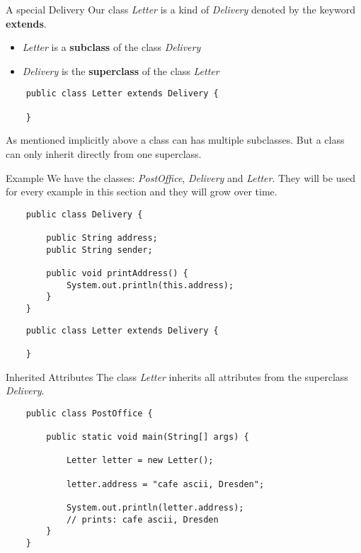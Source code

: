 \begin{frame}[fragile]{A special Delivery}
	Our class \emph{Letter} is a kind of \emph{Delivery} denoted by the keyword \textbf{extends}.
	\begin{itemize}
		\item \emph{Letter} is a \textbf{subclass} of the class \emph{Delivery}
		\item \emph{Delivery} is the \textbf{superclass} of the class \emph{Letter}
	\end{itemize}
	\begin{lstlisting}
	public class Letter extends Delivery {
	
	}
	\end{lstlisting}
	\vfill
	As mentioned implicitly above a class can has multiple subclasses. 
	But a class can only inherit directly from one superclass.
\end{frame}

\begin{frame}[fragile]{Example}
	We have the classes: \emph{PostOffice}, \emph{Delivery} and \emph{Letter}.
	They will be used for every example in this section and they will grow over time.
	\begin{lstlisting}
	public class Delivery {
	
	    public String address;
	    public String sender;
	    
	    public void printAddress() {
	        System.out.println(this.address);
	    }
	}
	\end{lstlisting}
	
	\begin{lstlisting}
	public class Letter extends Delivery {
	
	}
	\end{lstlisting}
\end{frame}

\begin{frame}[fragile]{Inherited Attributes}
	The class \emph{Letter} inherits all attributes from the superclass \emph{Delivery}.
	\begin{lstlisting}
	public class PostOffice {
	
	    public static void main(String[] args) {
	    
	        Letter letter = new Letter();
	        
	        letter.address = "cafe ascii, Dresden";
	        
	        System.out.println(letter.address);
	        // prints: cafe ascii, Dresden
	    }	
	}
	\end{lstlisting}
\end{frame}

